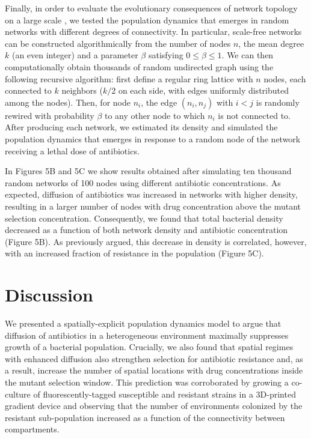 \documentclass[fleqn,12pt]{wlscirep}
\begin{document}
Finally, in order to evaluate the evolutionary consequences of network topology on a large scale \cite{Allen2017}, we tested the population dynamics that emerges in random networks with different degrees of connectivity\cite{Watts1998}.  In particular, scale-free networks can be constructed algorithmically from the number of nodes $n$, the mean degree $k$ (an even integer) and a parameter $\beta$ satisfying $0 \leq \beta \leq 1$. We can then computationally obtain thousands of random undirected graph using the following recursive algorithm: first define a regular ring lattice with $n$ nodes, each connected to $k$ neighbors ($k/2$ on each side, with edges uniformly distributed among the nodes). Then, for node $n_i$, the edge $(n_i, n_j)$ with $i < j$ is randomly rewired with probability $\beta$ to any other node to which $n_i$ is not connected to. After producing each network, we estimated its density and simulated the population dynamics that emerges in response to a random node of the network receiving a lethal dose of antibiotics.

In Figures 5B and 5C we show results obtained after simulating ten thousand random networks of 100 nodes using different antibiotic concentrations. As expected, diffusion of antibiotics was increased in networks with higher density, resulting in a larger number of nodes with drug concentration above the mutant selection concentration.  Consequently, we found that total bacterial density decreased as a function of both network density and antibiotic concentration (Figure 5B).  As previously argued, this decrease in density is correlated, however, with an increased fraction of resistance in the population (Figure 5C). 

\section*{Discussion}

We presented a spatially-explicit population dynamics model to argue that diffusion of antibiotics in a heterogeneous environment maximally suppresses growth of a bacterial population.  Crucially, we also found that spatial regimes with enhanced diffusion also strengthen selection for antibiotic resistance and, as a result, increase the number of spatial locations with drug concentrations inside the mutant selection window. This prediction was corroborated by growing a co-culture of fluorescently-tagged susceptible and resistant strains in a 3D-printed gradient device and observing that the number of environments colonized by the resistant sub-population increased as a function of the connectivity between compartments.
\end{document}
